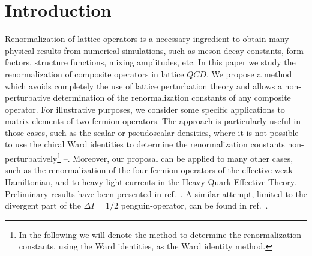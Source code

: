 \section{Introduction}
\label{sec:intro}

Renormalization of lattice operators
is a necessary ingredient to obtain many physical
results from numerical simulations, such as meson decay constants,
form factors, structure functions, mixing amplitudes, etc.
In this paper we study the
renormalization of composite operators in lattice $QCD$.
We propose a method which avoids completely
 the use of lattice perturbation theory and allows a non-perturbative
determination
of the renormalization constants of any composite operator.
For illustrative purposes, we consider some specific applications
to matrix elements of two-fermion operators.
The approach is particularly useful in those cases,
such as the scalar or pseudoscalar densities,
where it is not possible to use the chiral Ward identities to determine
the renormalization constants non-perturbatively\footnote{In the following
we will denote the method to determine the renormalization constants, using
the Ward identities, as the Ward identity method.}  \cite{bo}--\cite{wi}.
Moreover,
our proposal can be applied to many other cases,
such as   the renormalization of
the four-fermion operators of the effective weak
Hamiltonian, and to heavy-light currents in the Heavy Quark Effective
Theory. Preliminary results have been presented in ref.\ \cite{dallas}.
A similar attempt, limited to the divergent part of the $\Delta I=1/2$
penguin-operator, can be found in ref.\ \cite{ber1}.

